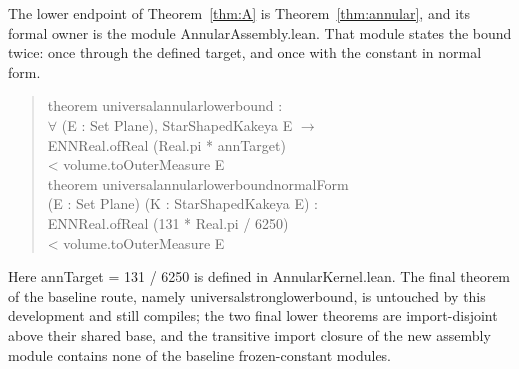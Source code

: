 \documentclass[11pt]{article}
\theoremstyle{plain}
\theoremstyle{definition}
\theoremstyle{remark}
\newcommand{\lean}[1]{%
  \begingroup\ttfamily\hyphenchar\font=-1\relax
  \def\_{\textunderscore\allowbreak}%
  #1\endgroup}
\begin{document}
The lower endpoint of Theorem~\ref{thm:A} is Theorem~\ref{thm:annular}, and its
formal owner is the module \lean{AnnularAssembly.lean}. That module states the
bound twice: once through the defined target, and once with the constant in
normal form.
\begin{quote}\small\raggedright
\lean{theorem universal\_annular\_lower\_bound :}\\
\hspace*{1em}\lean{$\forall$ (E : Set Plane), StarShapedKakeya E $\to$}\\
\hspace*{1em}\lean{ENNReal.ofReal (Real.pi * annTarget)}\\
\hspace*{3em}\lean{< volume.toOuterMeasure E}\\[3pt]
\lean{theorem universal\_annular\_lower\_bound\_normalForm}\\
\hspace*{1em}\lean{(E : Set Plane) (K : StarShapedKakeya E) :}\\
\hspace*{1em}\lean{ENNReal.ofReal (131 * Real.pi / 6250)}\\
\hspace*{3em}\lean{< volume.toOuterMeasure E}
\end{quote}
Here \lean{annTarget = 131 / 6250} is defined in \lean{AnnularKernel.lean}. The
final theorem of the baseline route, namely
\lean{universal\_strong\_lower\_bound}, is untouched by this development and
still compiles; the two final lower theorems are import-disjoint above their
shared base, and the transitive import closure of the new assembly module
contains none of the baseline frozen-constant modules.
\end{document}
